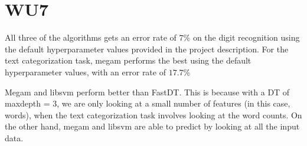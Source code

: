 \section{WU7}
All three of the algorithms gets an error rate of $7\%$ on the digit recognition using the default hyperparameter values provided in the project description. For the text categorization task, megam performs the best using the default hyperparameter values, with an error rate of $17.7\%$

Megam and libsvm perform better than FastDT. This is because with a DT of maxdepth = 3, we are only looking at a small number of features (in this case, words), when the text categorization task involves looking at the word counts. On the other hand, megam and libsvm are able to predict by looking at all the input data.


